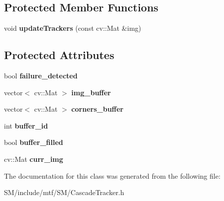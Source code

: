 \subsection*{Protected Member Functions}
\begin{DoxyCompactItemize}
\item 
\hypertarget{classCascadeTracker_a45f0e405d48ee932856a29983160a6ec}{void {\bfseries update\-Trackers} (const cv\-::\-Mat \&img)}\label{classCascadeTracker_a45f0e405d48ee932856a29983160a6ec}

\end{DoxyCompactItemize}
\subsection*{Protected Attributes}
\begin{DoxyCompactItemize}
\item 
\hypertarget{classCascadeTracker_a9da79c51b90de7e14a3a27a662155992}{bool {\bfseries failure\-\_\-detected}}\label{classCascadeTracker_a9da79c51b90de7e14a3a27a662155992}

\item 
\hypertarget{classCascadeTracker_a079cfc88c81d9e2f79f7a47be0c8ac3b}{vector$<$ cv\-::\-Mat $>$ {\bfseries img\-\_\-buffer}}\label{classCascadeTracker_a079cfc88c81d9e2f79f7a47be0c8ac3b}

\item 
\hypertarget{classCascadeTracker_a05e5f93d0fe65947f95a77faa8bc9eae}{vector$<$ cv\-::\-Mat $>$ {\bfseries corners\-\_\-buffer}}\label{classCascadeTracker_a05e5f93d0fe65947f95a77faa8bc9eae}

\item 
\hypertarget{classCascadeTracker_ad574dce0ac9be291f0347f39ae5aaf43}{int {\bfseries buffer\-\_\-id}}\label{classCascadeTracker_ad574dce0ac9be291f0347f39ae5aaf43}

\item 
\hypertarget{classCascadeTracker_a75c5584ebb989e299907acb77100610e}{bool {\bfseries buffer\-\_\-filled}}\label{classCascadeTracker_a75c5584ebb989e299907acb77100610e}

\item 
\hypertarget{classCascadeTracker_ac534daf73fbb3c14aaaead07644b9e42}{cv\-::\-Mat {\bfseries curr\-\_\-img}}\label{classCascadeTracker_ac534daf73fbb3c14aaaead07644b9e42}

\end{DoxyCompactItemize}


The documentation for this class was generated from the following file\-:\begin{DoxyCompactItemize}
\item 
S\-M/include/mtf/\-S\-M/Cascade\-Tracker.\-h\end{DoxyCompactItemize}
